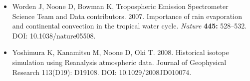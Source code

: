 \documentclass[11pt]{article}
\begin{document}
\begin{itemize}
  Sonntag D. 1990. Important new values of the physical constants of 1986, vapour pressure
  formulations based on the ITS-90, and psychrometer formulae. \emph{Zeitschrift für Meteorologie}
  \textbf{40:} 340--344.
\item
  Worden J, Noone D, Bowman K, Tropospheric Emission Spectrometer Science Team and Data
  contributors. 2007. Importance of rain evaporation and continental convection in the tropical
  water cycle. \emph{Nature} \textbf{445:} 528--532. DOI: 10.1038/nature05508.
\item
  Yoshimura K, Kanamitsu M, Noone D, Oki T. 2008. Historical isotope simulation using Reanalysis
  atmospheric data. Journal of Geophysical Research 113(D19): D19108. DOI: 10.1029/2008JD010074.
\end{itemize}



\end{document}
